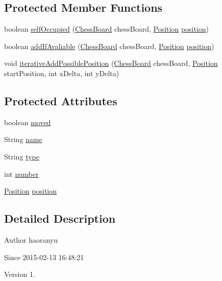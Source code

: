 \subsection*{Protected Member Functions}
\begin{DoxyCompactItemize}
\item 
boolean \hyperlink{classmodel_chess_pieces_1_1_chess_piece_a8045974b8d8f1e88722cd54b050774c5}{self\+Occupied} (\hyperlink{classmodel_core_1_1_chess_board}{Chess\+Board} chess\+Board, \hyperlink{classmodel_core_1_1_position}{Position} \hyperlink{classmodel_chess_pieces_1_1_chess_piece_a3d4362d5b28f6edb14161196d9c6807d}{position})
\item 
boolean \hyperlink{classmodel_chess_pieces_1_1_chess_piece_a247db1a354f7792b0a79b8128629a1c5}{add\+If\+Avaliable} (\hyperlink{classmodel_core_1_1_chess_board}{Chess\+Board} chess\+Board, \hyperlink{classmodel_core_1_1_position}{Position} \hyperlink{classmodel_chess_pieces_1_1_chess_piece_a3d4362d5b28f6edb14161196d9c6807d}{position})
\item 
void \hyperlink{classmodel_chess_pieces_1_1_chess_piece_a86900a063a4596d7445e8bd2af895445}{iterative\+Add\+Possible\+Position} (\hyperlink{classmodel_core_1_1_chess_board}{Chess\+Board} chess\+Board, \hyperlink{classmodel_core_1_1_position}{Position} start\+Position, int x\+Delta, int y\+Delta)
\end{DoxyCompactItemize}
\subsection*{Protected Attributes}
\begin{DoxyCompactItemize}
\item 
boolean \hyperlink{classmodel_chess_pieces_1_1_chess_piece_a5bc0722badda5dc066b6a73476fc933c}{moved}
\item 
String \hyperlink{classmodel_chess_pieces_1_1_chess_piece_a03d2fb76fbbff0dab72d00f2173a69ff}{name}
\item 
String \hyperlink{classmodel_chess_pieces_1_1_chess_piece_a195487ca88c197af7c1604247be31db2}{type}
\item 
int \hyperlink{classmodel_chess_pieces_1_1_chess_piece_a979e63b99128333883acedc38d25dc87}{number}
\item 
\hyperlink{classmodel_core_1_1_position}{Position} \hyperlink{classmodel_chess_pieces_1_1_chess_piece_a3d4362d5b28f6edb14161196d9c6807d}{position}
\end{DoxyCompactItemize}


\subsection{Detailed Description}
\begin{DoxyAuthor}{Author}
haoranyu 
\end{DoxyAuthor}
\begin{DoxySince}{Since}
2015-\/02-\/13 16\+:48\+:21 
\end{DoxySince}
\begin{DoxyVersion}{Version}
1. 
\end{DoxyVersion}


